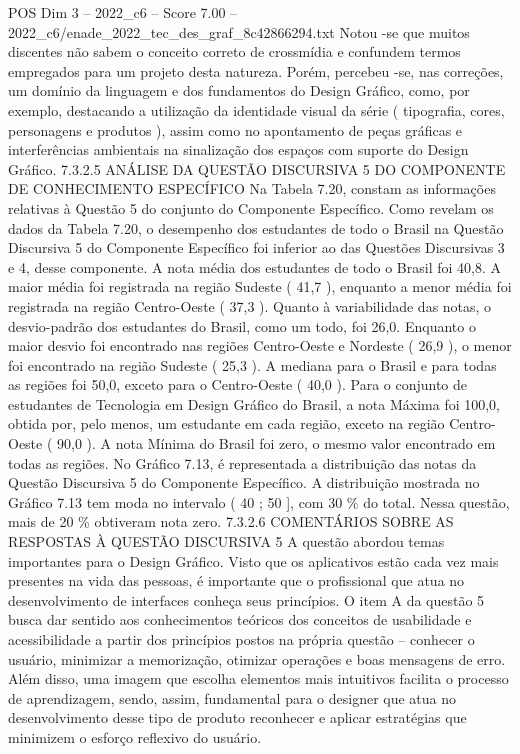 \begin{textsample}{POS Dim 3 – 2022\_c6 – Score 7.00 – 2022\_c6/enade\_2022\_tec\_des\_graf\_8c42866294.txt}
Notou -se que muitos discentes não sabem o conceito correto de crossmídia e confundem termos empregados para um projeto desta natureza.
Porém, percebeu -se, nas correções, um domínio da linguagem e dos fundamentos do Design Gráfico, como, por exemplo, destacando a utilização da identidade visual da série ( tipografia, cores, personagens e produtos ), assim como no apontamento de peças gráficas e interferências ambientais na sinalização dos espaços com suporte do Design Gráfico. 7.3.2.5 ANÁLISE DA QUESTÃO DISCURSIVA 5 DO COMPONENTE DE CONHECIMENTO ESPECÍFICO Na Tabela 7.20, constam as informações relativas à Questão 5 do conjunto do Componente Específico.
Como revelam os dados da Tabela 7.20, o desempenho dos estudantes de todo o Brasil na Questão Discursiva 5 do Componente Específico foi inferior ao das Questões Discursivas 3 e 4, desse componente.
A nota média dos estudantes de todo o Brasil foi 40,8.
A maior média foi registrada na região Sudeste ( 41,7 ), enquanto a menor média foi registrada na região Centro-Oeste ( 37,3 ).
Quanto à variabilidade das notas, o desvio-padrão dos estudantes do Brasil, como um todo, foi 26,0.
Enquanto o maior desvio foi encontrado nas regiões Centro-Oeste e Nordeste ( 26,9 ), o menor foi encontrado na região Sudeste ( 25,3 ).
A mediana para o Brasil e para todas as regiões foi 50,0, exceto para o Centro-Oeste ( 40,0 ).
Para o conjunto de estudantes de Tecnologia em Design Gráfico do Brasil, a nota Máxima foi 100,0, obtida por, pelo menos, um estudante em cada região, exceto na região Centro-Oeste ( 90,0 ).
A nota Mínima do Brasil foi zero, o mesmo valor encontrado em todas as regiões.
No Gráfico 7.13, é representada a distribuição das notas da Questão Discursiva 5 do Componente Específico.
A distribuição mostrada no Gráfico 7.13 tem moda no intervalo ( 40 ; 50 ], com 30 \% do total.
Nessa questão, mais de 20 \% obtiveram nota zero. 7.3.2.6 COMENTÁRIOS SOBRE AS RESPOSTAS À QUESTÃO DISCURSIVA 5 A questão abordou temas importantes para o Design Gráfico.
Visto que os aplicativos estão cada vez mais presentes na vida das pessoas, é importante que o profissional que atua no desenvolvimento de interfaces conheça seus princípios.
O item A da questão 5 busca dar sentido aos conhecimentos teóricos dos conceitos de usabilidade e acessibilidade a partir dos princípios postos na própria questão – conhecer o usuário, minimizar a memorização, otimizar operações e boas mensagens de erro.
Além disso, uma imagem que escolha elementos mais intuitivos facilita o processo de aprendizagem, sendo, assim, fundamental para o designer que atua no desenvolvimento desse tipo de produto reconhecer e aplicar estratégias que minimizem o esforço reflexivo do usuário.

\end{textsample}
